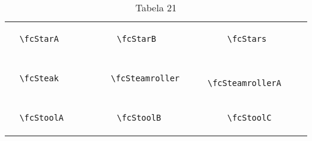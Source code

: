 \documentclass[x11names]{article}
\begin{document}
\begin{table}[H]
\begin{tabular}{|c|c|c|c|c|c|}
		&\multirow{5}{*}{	\fcStarA	[scale=0.4]} & &\multirow{5}{*}{	\fcStarB	[scale=0.4]} & &\multirow{5}{*}{	\fcStars	[scale=0.4]}\\	& & & & & \\	& & & & & \\	\verb|	\fcStarA	| & & \verb|	\fcStarB	| & & \verb|	\fcStars	| & \\	& & & & & \\	& & & & & \\	& & & & & \\	\hline									
		&\multirow{5}{*}{	\fcSteak	[scale=0.4]} & &\multirow{5}{*}{	\fcSteamroller	[scale=0.4]} & &\multirow{5}{*}{	\fcSteamrollerA	[scale=0.3]}\\	& & & & & \\	& & & & & \\	\verb|	\fcSteak	| & & \verb|	\fcSteamroller	| & & \verb|	\fcSteamrollerA	| & \\	& & & & & \\	& & & & & \\	& & & & & \\	\hline									
		&\multirow{5}{*}{	\fcStoolA	[scale=0.4]} & &\multirow{5}{*}{	\fcStoolB	[scale=0.4]} & &\multirow{5}{*}{	\fcStoolC	[scale=0.4]}\\	& & & & & \\	& & & & & \\	\verb|	\fcStoolA	| & & \verb|	\fcStoolB	| & & \verb|	\fcStoolC	| & \\	& & & & & \\	& & & & & \\	& & & & & \\		\hline 	\hline 	\end{tabular}	\caption{	Tabela 21	}\label{	Tab21	}\end{table}
\end{document}
